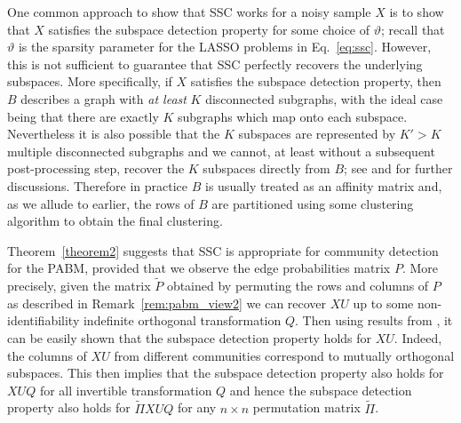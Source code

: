 \documentclass[12pt]{article}
\begin{document}
\begin{remark}
One common approach to show that SSC works for a noisy sample $X$ is to show that $X$ satisfies the subspace detection property for some choice of $\vartheta$; 
recall that $\vartheta$ is the sparsity parameter for
the LASSO problems in Eq.~\eqref{eq:ssc}. However, this is not sufficient to
guarantee that SSC perfectly recovers the underlying subspaces.
More specifically, if $X$ satisfies the 
subspace detection property, 
then $B$ describes a graph with {\em at least} $K$ disconnected subgraphs, 
with the ideal case being that there are exactly $K$ subgraphs 
which map onto each subspace. 
Nevertheless it is also possible that the $K$ subspaces are represented by
$K' > K$
multiple disconnected subgraphs and we cannot, at least without a subsequent
post-processing step, recover the $K$ subspaces directly from $B$;
see \citet{sdp_sufficiency} and \citet{liu_ssc}
for further discussions. Therefore in practice $B$ is usually treated as an
affinity matrix and, as we allude to earlier, 
the rows of $B$ are partitioned using some
clustering algorithm to obtain the final clustering. 
\end{remark}

Theorem~\ref{theorem2} suggests that SSC is appropriate for community
detection for the PABM, provided that we observe the edge probabilities
matrix $P$. More precisely, given the matrix $\tilde{P}$ obtained by
permuting the rows and columns of $P$ as described in
Remark~\ref{rem:pabm_view2} we can recover $XU$ up
to some non-identifiability indefinite orthogonal transformation $Q$. 
Then using results from \citet{soltanolkotabi2012}, it can be easily shown
that the subspace detection property holds for \(XU\). Indeed, the columns
of \(XU\) from different communities correspond to mutually
orthogonal subspaces. This then implies that the
subspace detection property also holds for $XUQ$ for all invertible
transformation $Q$ and hence the subspace detection property also holds for
$\tilde{\Pi} X U Q$ for any $n \times n$ permutation matrix $\tilde{\Pi}$. 
\end{document}
